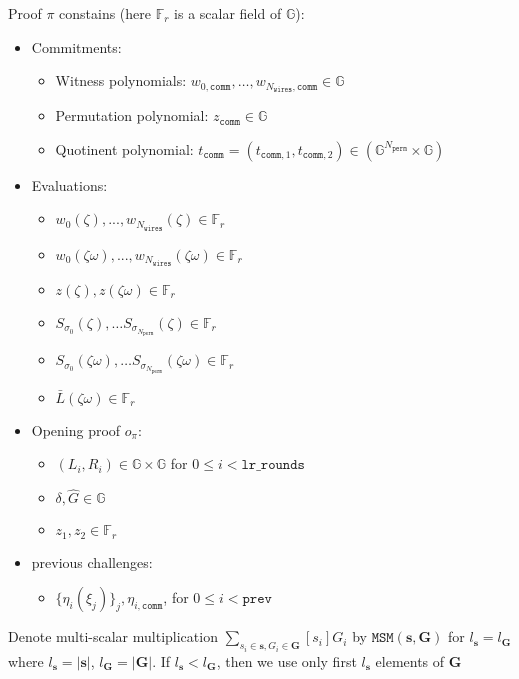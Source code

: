 Proof $\pi$ constains (here $\mathbb{F}_r$ is a scalar field of $\mathbb{G}$):
\begin{itemize}\label{proof-state}
	\item Commitments:
	\begin{itemize}
		\item Witness polynomials: $w_{0, \texttt{comm}}, \dots, w_{N_{\texttt{wires}}, \texttt{comm}} \in \mathbb{G}$
		\item Permutation polynomial: $z_{\texttt{comm}} \in \mathbb{G}$
		\item Quotinent polynomial: $t_{\texttt{comm}} = (t_{\texttt{comm}, 1}, t_{\texttt{comm}, 2}) \in (\mathbb{G}^{N_{\texttt{perm}}} \times \mathbb{G})$
	\end{itemize}
	\item Evaluations:
	\begin{itemize}
		\item $w_0(\zeta), ..., w_{N_{\texttt{wires}}}(\zeta) \in \mathbb{F}_r$
		\item $w_0(\zeta\omega), ..., w_{N_{\texttt{wires}}}(\zeta\omega) \in \mathbb{F}_r$
		\item $z(\zeta), z(\zeta\omega) \in \mathbb{F}_r$
		\item $S_{\sigma_0}(\zeta), \dots S_{\sigma_{N_{\texttt{perm}}}}(\zeta) \in \mathbb{F}_r$
		\item $S_{\sigma_0}(\zeta\omega), \dots S_{\sigma_{N_{\texttt{perm}}}}(\zeta\omega) \in \mathbb{F}_r$
		\item $\bar{L}(\zeta\omega) \in \mathbb{F}_r$
	\end{itemize}
	\item Opening proof $o_\pi$:
	\begin{itemize}
		\item $(L_i, R_i) \in \mathbb{G} \times \mathbb{G}$ for $0 \leq i < \texttt{lr\_rounds}$ %
		\item $\delta, \hat{G} \in \mathbb{G}$
		\item $z_1, z_2 \in \mathbb{F}_{r}$
	\end{itemize}
	\item previous challenges:
	\begin{itemize}
		\item $\{\eta_i(\xi_j)\}_{j}, \eta_{i, \texttt{comm}}$, for $0 \leq i < \texttt{prev}$
	\end{itemize}
\end{itemize}


Denote multi-scalar multiplication $\sum\limits_{s_i \in \textbf{s}, G_i \in \textbf{G}}[s_i]G_i$ by $\texttt{MSM}(\textbf{s}, \textbf{G})$ for $l_{\textbf{s}} = l_{\textbf{G}}$ where $l_{\textbf{s}} = |\textbf{s}|$, $l_{\textbf{G}} = |\textbf{G}|$. 
If $l_{\textbf{s}} < l_{\textbf{G}}$, then we use only first $l_{\textbf{s}}$ elements of $\textbf{G}$


